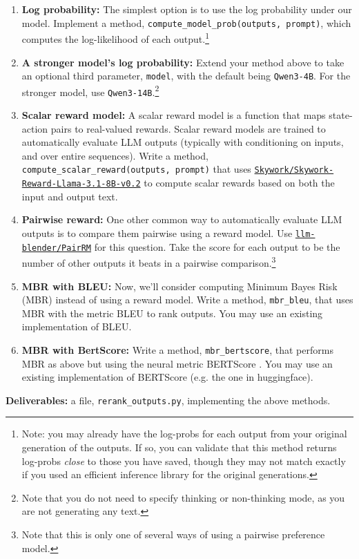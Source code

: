 \documentclass{article}
\begin{document}
\begin{enumerate}
    \item \textbf{Log probability:} The simplest option is to use the log probability under our model. Implement a method, \texttt{compute\_model\_prob(outputs, prompt)}, which computes the log-likelihood of each output.\footnote{Note: you may already have the log-probs for each output from your original generation of the outputs. If so, you can validate that this method returns log-probs \textit{close} to those you have saved, though they may not match exactly if you used an efficient inference library for the original generations.}
    \item \textbf{A stronger model's log probability:} Extend your method above to take an optional third parameter, \texttt{model}, with the default being \texttt{Qwen3-4B}. For the stronger model, use \texttt{Qwen3-14B}.\footnote{Note that you do not need to specify thinking or non-thinking mode, as you are not generating any text.}
    \item \textbf{Scalar reward model:} A scalar reward model is a function that maps state-action pairs to real-valued rewards. Scalar reward models are trained to automatically evaluate LLM outputs (typically with conditioning on inputs, and over entire sequences). Write a method, \texttt{compute\_scalar\_reward(outputs, prompt)} that uses  \href{https://huggingface.co/Skywork/Skywork-Reward-Llama-3.1-8B-v0.2}{\texttt{Skywork/Skywork-Reward-Llama-3.1-8B-v0.2}} \cite{liu2024skyworkrewardbagtricksreward} to compute scalar rewards based on both the input and output text.
    \item \textbf{Pairwise reward:} One other common way to automatically evaluate LLM outputs is to compare them pairwise using a reward model. Use \href{https://huggingface.co/llm-blender/PairRM}{\texttt{llm-blender/PairRM}} \cite{jiang2023llmblenderPairRM} for this question. Take the score for each output to be the number of other outputs it beats in a pairwise comparison.\footnote{Note that this is only one of several ways of using a pairwise preference model.} 
    \item \textbf{MBR with BLEU:} Now, we'll consider computing Minimum Bayes Risk (MBR) instead of using a reward model. Write a method, \texttt{mbr\_bleu}, that uses MBR with the metric BLEU to rank outputs. You may use an existing implementation of BLEU.
    \item \textbf{MBR with BertScore:} Write a method, \texttt{mbr\_bertscore}, that performs MBR as above but using the neural metric BERTScore \cite{zhang2020bertscoreevaluatingtextgeneration}. You may use an existing implementation of BERTScore (e.g. the one in huggingface).
\end{enumerate}
\textbf{Deliverables:} a file, \texttt{rerank\_outputs.py}, implementing the above methods.
\end{document}
